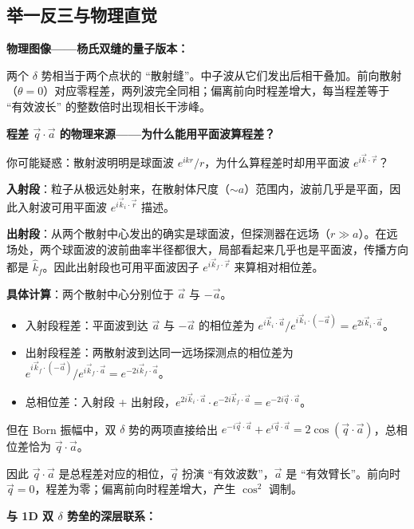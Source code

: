 \subsection{举一反三与物理直觉}

\begin{insightbox}[举一反三与物理直觉]
\textbf{物理图像——杨氏双缝的量子版本：}

两个 $\delta$ 势相当于两个点状的 ``散射缝''。中子波从它们发出后相干叠加。前向散射（$\theta = 0$）对应零程差，两列波完全同相；偏离前向时程差增大，每当程差等于 ``有效波长'' 的整数倍时出现相长干涉峰。

\textbf{程差 $\vec{q}\cdot\vec{a}$ 的物理来源——为什么能用平面波算程差？}

你可能疑惑：散射波明明是球面波 $e^{ikr}/r$，为什么算程差时却用平面波 $e^{i\vec{k}\cdot\vec{r}}$？

\textbf{入射段}：粒子从极远处射来，在散射体尺度（$\sim a$）范围内，波前几乎是平面，因此入射波可用平面波 $e^{i\vec{k}_i\cdot\vec{r}}$ 描述。

\textbf{出射段}：从两个散射中心发出的确实是球面波，但探测器在远场（$r \gg a$）。在远场处，两个球面波的波前曲率半径都很大，局部看起来几乎也是平面波，传播方向都是 $\hat{k}_f$。因此出射段也可用平面波因子 $e^{i\vec{k}_f\cdot\vec{r}}$ 来算相对相位差。

\textbf{具体计算}：两个散射中心分别位于 $\vec{a}$ 与 $-\vec{a}$。
\begin{itemize}
    \item 入射段程差：平面波到达 $\vec{a}$ 与 $-\vec{a}$ 的相位差为 $e^{i\vec{k}_i\cdot\vec{a}}/e^{i\vec{k}_i\cdot(-\vec{a})} = e^{2i\vec{k}_i\cdot\vec{a}}$。
    \item 出射段程差：两散射波到达同一远场探测点的相位差为 $e^{i\vec{k}_f\cdot(-\vec{a})}/e^{i\vec{k}_f\cdot\vec{a}} = e^{-2i\vec{k}_f\cdot\vec{a}}$。
    \item 总相位差：入射段 + 出射段，$e^{2i\vec{k}_i\cdot\vec{a}} \cdot e^{-2i\vec{k}_f\cdot\vec{a}} = e^{-2i\vec{q}\cdot\vec{a}}$。
\end{itemize}
但在 Born 振幅中，双 $\delta$ 势的两项直接给出 $e^{-i\vec{q}\cdot\vec{a}} + e^{i\vec{q}\cdot\vec{a}} = 2\cos(\vec{q}\cdot\vec{a})$，总相位差恰为 $\vec{q}\cdot\vec{a}$。

因此 $\vec{q}\cdot\vec{a}$ 是总程差对应的相位，$\vec{q}$ 扮演 ``有效波数''，$\vec{a}$ 是 ``有效臂长''。前向时 $\vec{q} = 0$，程差为零；偏离前向时程差增大，产生 $\cos^2$ 调制。

\textbf{与 1D 双 $\delta$ 势垒的深层联系：}


\end{insightbox}
